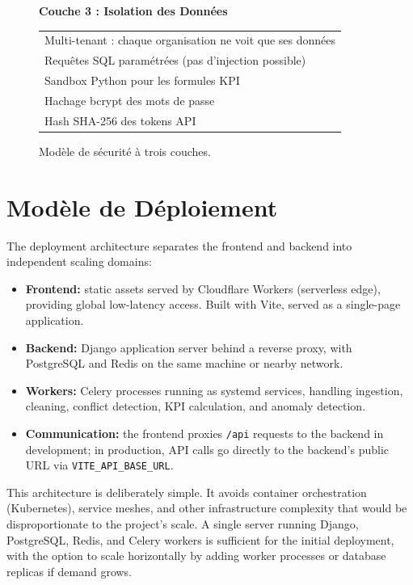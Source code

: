 \begin{figure}[h!]
{{\vspace{0.3cm}
\textbf{Couche 3 : Isolation des Données}
\begin{tabular}{|l|}
\hline
Multi-tenant : chaque organisation ne voit que ses données \\
Requêtes SQL paramétrées (pas d'injection possible) \\
Sandbox Python pour les formules KPI \\
Hachage bcrypt des mots de passe \\
Hash SHA-256 des tokens API \\
\hline
\end{tabular}

\vspace{0.5cm}
}}
\caption{Modèle de sécurité à trois couches.}
\label{fig:security}
\end{figure}


\section{Modèle de Déploiement}

\noindent
The deployment architecture separates the frontend
and backend into independent scaling domains:

\begin{itemize}
  \item \textbf{Frontend:} static assets served by
        Cloudflare Workers (serverless edge),
        providing global low-latency access.
        Built with Vite, served as a single-page application.
  \item \textbf{Backend:} Django application server
        behind a reverse proxy,
        with PostgreSQL and Redis on the same machine
        or nearby network.
  \item \textbf{Workers:} Celery processes running
        as systemd services,
        handling ingestion, cleaning, conflict detection,
        KPI calculation, and anomaly detection.
  \item \textbf{Communication:} the frontend proxies
        \texttt{/api} requests to the backend
        in development; in production,
        API calls go directly to the backend's
        public URL via \texttt{VITE\_API\_BASE\_URL}.
\end{itemize}

\noindent
This architecture is deliberately simple.
It avoids container orchestration (Kubernetes),
service meshes, and other infrastructure complexity
that would be disproportionate to the project's scale.
A single server running Django, PostgreSQL, Redis,
and Celery workers is sufficient for the initial deployment,
with the option to scale horizontally
by adding worker processes or database replicas
if demand grows.



